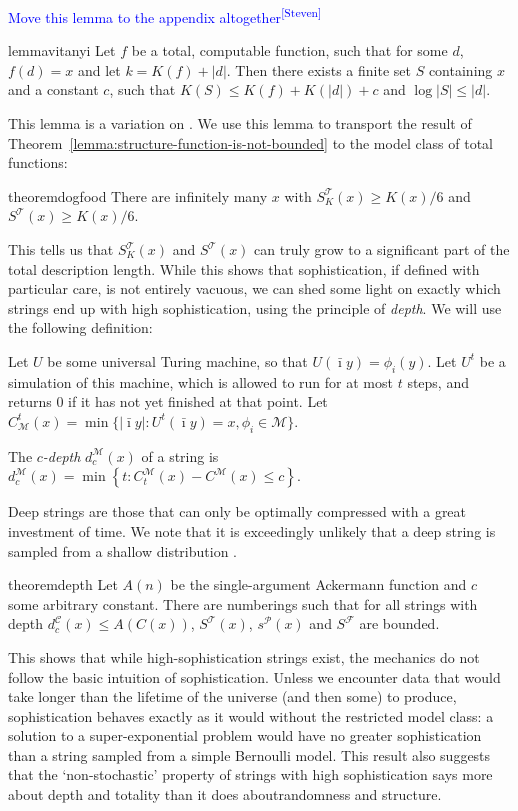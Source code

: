 \documentclass{style/llncs}
\newcommand{\M}{\mathscr M}
\newcommand{\C}{\mathscr C}
\newcommand{\T}{\mathscr T}
\newcommand{\F}{\mathscr F}
\renewcommand{\P}{\mathscr P}
\newcommand{\s}{S}
\newcommand{\sdr}[1]{\textcolor{blue}{\small #1\textsuperscript{[Steven]} }}
\begin{document}
\sdr{Move this lemma to the appendix altogether}
\begin{restatable}{lemma}{vitanyi}
Let $f$ be a total, computable function, such that for some $d$, $f(d) = x$ and let $k = K(f) + |d|$. Then there exists a finite set $S$ containing $x$ and a constant $c$, such that $K(S) \leq K(f) + K(|d|) + c$ and $\log |S| \leq |d|$.\label{lemma:total-to-sets}
\end{restatable}
\noindent This lemma is a variation on \cite[Lemma~7.2]{vitanyi2004meaningful}. We use this lemma to transport the result of Theorem~\ref{lemma:structure-function-is-not-bounded} to the model class of total functions:

\begin{restatable}{theorem}{dogfood}
There are infinitely many $x$ with $S^\T_K(x) \geq K(x)/6$ and $S^\T(x) \geq K(x)/6$. 
\end{restatable} 
\noindent This tells us that $S^\T_K(x)$ and $S^\T(x)$ can truly grow to a significant part of the total description length. While this shows that sophistication, if defined with particular care, is not entirely vacuous, we can shed some light on exactly which strings end up with high sophistication, using the principle of \emph{depth}. We will use the following definition:

\begin{definition}\belowdisplayskip=-12pt
Let $U$ be some universal Turing machine, so that $U(\bar\imath y) = \phi_i(y)$. Let $U^t$ be a simulation of this machine, which is allowed to run for at most $t$ steps, and returns $0$ if it has not yet finished at that point. Let $C^t_\M(x) = \min\{|\bar\imath y| : U^t(\bar\imath y) = x, \phi_i \in \M\}$.

The \emph{$c$-depth} $d^\M_c(x)$ of a string is $d^\M_c(x) = \min \left\{t : C^\M_t(x) - C^\M(x) \leq c \right\}$.
\end{definition}

Deep strings are those that can only be optimally compressed with a great investment of time. We note that it is exceedingly unlikely that a deep string is sampled from a shallow distribution \cite{bloem2014safe,bennett1988logical}.
 
\begin{restatable}{theorem}{depth}
Let $A(n)$ be the single-argument Ackermann function and $c$ some arbitrary constant. There are numberings such that for all strings with depth $d^\C_c(x) \leq A(C(x))$, $\s^\T(x)$, $s^\P(x)$ and $\s^\F$ are bounded.
\end{restatable}
\noindent This shows that while high-sophistication strings exist, the mechanics do not follow the basic intuition of sophistication. Unless we encounter data that would take longer than the lifetime of the universe (and then some) to produce, sophistication behaves exactly as it would without the restricted model class: a solution to a super-exponential problem would have no greater sophistication than a string sampled from a simple Bernoulli model. This result also suggests that the `non-stochastic' property of strings with high sophistication\cite{shen1983concept,vereshchagin2004kolmogorov} says more about depth and totality than it does aboutrandomness and structure.
\end{document}
